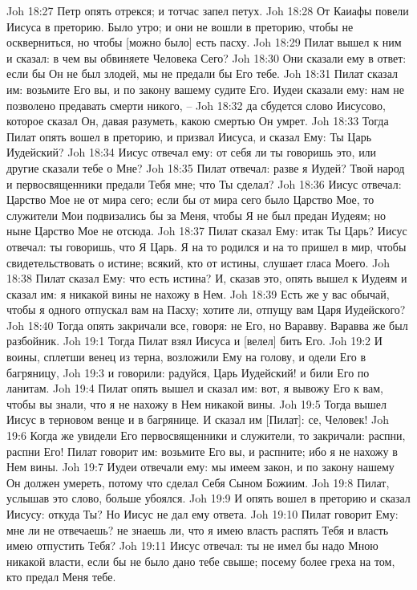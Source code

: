 Joh 18:27  Петр опять отрекся; и тотчас запел петух.
Joh 18:28  От Каиафы повели Иисуса в преторию. Было утро; и они не вошли в преторию, чтобы не оскверниться, но чтобы [можно было] есть пасху.
Joh 18:29  Пилат вышел к ним и сказал: в чем вы обвиняете Человека Сего?
Joh 18:30  Они сказали ему в ответ: если бы Он не был злодей, мы не предали бы Его тебе.
Joh 18:31  Пилат сказал им: возьмите Его вы, и по закону вашему судите Его. Иудеи сказали ему: нам не позволено предавать смерти никого, --
Joh 18:32  да сбудется слово Иисусово, которое сказал Он, давая разуметь, какою смертью Он умрет.
Joh 18:33  Тогда Пилат опять вошел в преторию, и призвал Иисуса, и сказал Ему: Ты Царь Иудейский?
Joh 18:34  Иисус отвечал ему: от себя ли ты говоришь это, или другие сказали тебе о Мне?
Joh 18:35  Пилат отвечал: разве я Иудей? Твой народ и первосвященники предали Тебя мне; что Ты сделал?
Joh 18:36  Иисус отвечал: Царство Мое не от мира сего; если бы от мира сего было Царство Мое, то служители Мои подвизались бы за Меня, чтобы Я не был предан Иудеям; но ныне Царство Мое не отсюда.
Joh 18:37  Пилат сказал Ему: итак Ты Царь? Иисус отвечал: ты говоришь, что Я Царь. Я на то родился и на то пришел в мир, чтобы свидетельствовать о истине; всякий, кто от истины, слушает гласа Моего.
Joh 18:38  Пилат сказал Ему: что есть истина? И, сказав это, опять вышел к Иудеям и сказал им: я никакой вины не нахожу в Нем.
Joh 18:39  Есть же у вас обычай, чтобы я одного отпускал вам на Пасху; хотите ли, отпущу вам Царя Иудейского?
Joh 18:40  Тогда опять закричали все, говоря: не Его, но Варавву. Варавва же был разбойник.
Joh 19:1  Тогда Пилат взял Иисуса и [велел] бить Его.
Joh 19:2  И воины, сплетши венец из терна, возложили Ему на голову, и одели Его в багряницу,
Joh 19:3  и говорили: радуйся, Царь Иудейский! и били Его по ланитам.
Joh 19:4  Пилат опять вышел и сказал им: вот, я вывожу Его к вам, чтобы вы знали, что я не нахожу в Нем никакой вины.
Joh 19:5  Тогда вышел Иисус в терновом венце и в багрянице. И сказал им [Пилат]: се, Человек!
Joh 19:6  Когда же увидели Его первосвященники и служители, то закричали: распни, распни Его! Пилат говорит им: возьмите Его вы, и распните; ибо я не нахожу в Нем вины.
Joh 19:7  Иудеи отвечали ему: мы имеем закон, и по закону нашему Он должен умереть, потому что сделал Себя Сыном Божиим.
Joh 19:8  Пилат, услышав это слово, больше убоялся.
Joh 19:9  И опять вошел в преторию и сказал Иисусу: откуда Ты? Но Иисус не дал ему ответа.
Joh 19:10  Пилат говорит Ему: мне ли не отвечаешь? не знаешь ли, что я имею власть распять Тебя и власть имею отпустить Тебя?
Joh 19:11  Иисус отвечал: ты не имел бы надо Мною никакой власти, если бы не было дано тебе свыше; посему более греха на том, кто предал Меня тебе.
